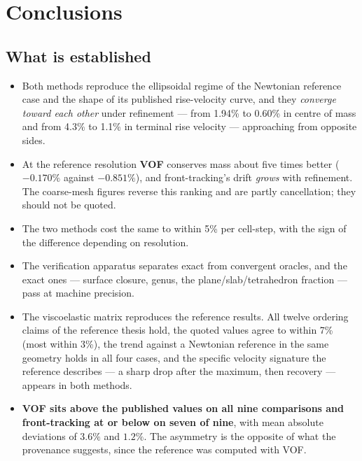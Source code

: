 \section{Conclusions}
\label{sec:conclusions}



\subsection*{What is established}

\begin{itemize}
\item Both methods reproduce the ellipsoidal regime of the Newtonian reference
case and the shape of its published rise-velocity curve, and they \emph{converge
toward each other} under refinement --- from 1.94\% to 0.60\% in centre of mass
and from 4.3\% to 1.1\% in terminal rise velocity --- approaching from opposite
sides.
\item At the reference resolution \textbf{VOF} conserves mass about five times
better ($-0.170\%$ against $-0.851\%$), and front-tracking's drift \emph{grows}
with refinement. The coarse-mesh figures reverse this ranking and are partly
cancellation; they should not be quoted.
\item The two methods cost the same to within 5\% per cell-step, with the sign
of the difference depending on resolution.
\item The verification apparatus separates exact from convergent oracles, and
the exact ones --- surface closure, genus, the plane/slab/tetrahedron fraction
--- pass at machine precision.
\item The viscoelastic matrix reproduces the reference results. All twelve
ordering claims of the reference thesis hold, the quoted values agree to within
7\% (most within 3\%), the trend against a Newtonian reference in the same
geometry holds in all four cases, and the specific velocity signature the
reference describes --- a sharp drop after the maximum, then recovery ---
appears in both methods.
\item \textbf{VOF sits above the published values on all nine comparisons and
front-tracking at or below on seven of nine}, with mean absolute deviations of
$3.6\%$ and $1.2\%$. The asymmetry is the opposite of what the provenance
suggests, since the reference was computed with VOF.

\end{itemize}
